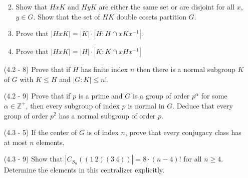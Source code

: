 \documentclass[12pt]{article}
\newcommand{\mz}{\mathbb{Z}}
\begin{document}
\begin{enumerate}
\begin{enumerate}
\begin{mybox}
    \vspace*{10mm}
\end{mybox}


\item Show that $HxK$ and $HyK$ are either the same set
    or are disjoint for all $x$, $y\in G$.
    Show that the set of $HK$ double cosets partition $G$.
\begin{mybox}
    
    \vspace*{10mm}
\end{mybox}

\item Prove that $|HxK|=|K|\cdot|H:H\cap xKx^{-1}|$.
\begin{mybox}
    
    \vspace*{10mm}
\end{mybox}

\item Prove that $|HxK|=|H|\cdot|K:K\cap xHx^{-1}|$
\begin{mybox}

    \vspace*{10mm}
\end{mybox}
\end{enumerate}

\item[(4.2 - 8)] Prove that if $H$ has finite index $n$
    then there is a normal subgroup $K$ of $G$ with
    $K\leq H$ and $|G:K|\leq n!$.
\begin{mybox}

    \vspace*{10mm}
\end{mybox}


\item[(4.2 - 9)] Prove that if $p$ is a prime and $G$
    is a group of order $p^\alpha$ for some $\alpha\in\mz^+$,
    then every subgroup of index $p$ is normal in $G$.
    Deduce that every group of order $p^2$ has a normal
    subgroup of order $p$.
\begin{mybox}
    
    \vspace*{10mm}
\end{mybox}

\item[(4.3 - 5)] If the center of $G$ is of index $n$,
    prove that every conjugacy class has at most $n$
    elements.
\begin{mybox}
    
    \vspace*{10mm}
\end{mybox}

\item[(4.3 - 9)] Show that $|C_{S_n}((1\ 2)(3\ 4))|=
    8\cdot (n-4)!$ for all $n\geq 4$. Determine the elements
    in this centralizer explicitly.
\begin{mybox}
    
    \vspace*{10mm}
\end{mybox}
\end{enumerate}
\end{document}
